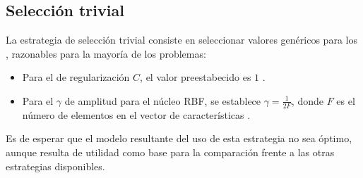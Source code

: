 %
%
\subsection{Selección trivial}
%
La estrategia de selección trivial consiste en seleccionar valores
genéricos para los , razonables para la mayoría de los
problemas:
%
\begin{itemize}
\item
  Para el \hparam{} de regularización $C$, el valor preestabecido es
  $1$ \cite{libsvm}.
\item
  Para el \hparam{} $\gamma$ de amplitud para el núcleo RBF, se
  establece $\gamma=\frac{1}{2F}$, donde $F$ es el número de elementos
  en el vector de características \cite{glasmachersigel}.
\end{itemize}
%
Es de esperar que el modelo resultante del uso de esta estrategia no
sea óptimo, aunque resulta de utilidad como base para la comparación
frente a las otras estrategias disponibles.
